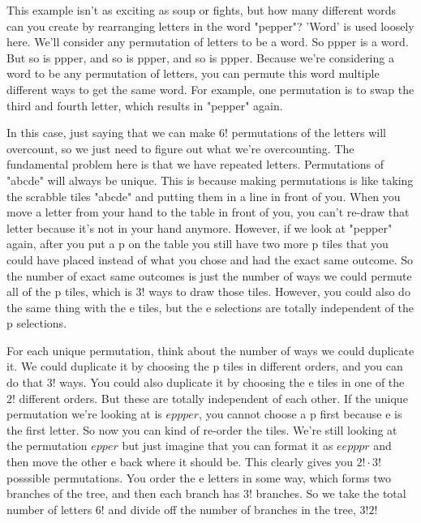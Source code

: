 \documentclass{article}
\begin{document}
    This example isn't as exciting as soup or fights, but how many different words can you create by rearranging letters in the word "pepper"?
    'Word' is used loosely here. We'll consider any permutation of letters to be a word.
    So ppper is a word.
    But so is ppper, and so is ppper, and so is ppper.
    Because we're considering a word to be any permutation of letters, you can permute this word multiple different ways to get the same word.
    For example, one permutation is to swap the third and fourth letter, which results in "pepper" again.

    In this case, just saying that we can make $6!$ permutations of the letters will overcount, so we just need to figure out what we're overcounting.
    The fundamental problem here is that we have repeated letters.
    Permutations of "abcde" will always be unique.
    This is because making permutations is like taking the scrabble tiles "abcde" and putting them in a line in front of you.
    When you move a letter from your hand to the table in front of you, you can't re-draw that letter because it's not in your hand anymore.
    However, if we look at "pepper" again, after you put a p on the table you still have two more p tiles that you could have placed instead of what you chose and had the exact same outcome.
    So the number of exact same outcomes is just the number of ways we could permute all of the p tiles, which is $3!$ ways to draw those tiles.
    However, you could also do the same thing with the e tiles, but the e selections are totally independent of the p selections.
    
    For each unique permutation, think about the number of ways we could duplicate it.
    We could duplicate it by choosing the p tiles in different orders, and you can do that $3!$ ways.
    You could also duplicate it by choosing the e tiles in one of the $2!$ different orders.
    But these are totally independent of each other.
    If the unique permutation we're looking at is $eppper$, you cannot choose a p first because e is the first letter.
    So now you can kind of re-order the tiles.
    We're still looking at the permutation $epper$ but just imagine that you can format it as $eepppr$ and then move the other e back where it should be.
    This clearly gives you $2!\cdot 3!$ posssible permutations.
    You order the e letters in some way, which forms two branches of the tree, and then each branch has $3!$ branches.
    So we take the total number of letters $6!$ and divide off the number of branches in the tree, $3!2!$
    
\end{document}
